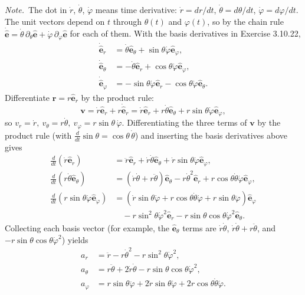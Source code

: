 \emph{Note.}~The dot in $\dot{r}$, $\dot{\theta}$, $\dot{\varphi}$ means time
derivative: $\dot{r}=dr/dt$, $\dot{\theta}=d\theta/dt$,
$\dot{\varphi}=d\varphi/dt$.
\solution
The unit vectors depend on $t$ through $\theta(t)$ and $\varphi(t)$,
so by the chain rule
$\dot{\hat{\mathbf e}}=\dot\theta\,\partial_\theta\hat{\mathbf e}
+\dot\varphi\,\partial_\varphi\hat{\mathbf e}$ for each of them. With
the basis derivatives in Exercise 3.10.22,
\[
\begin{aligned}
\dot{\hat{\mathbf e}}_r&=\dot\theta\hat{\mathbf e}_\theta+
\sin\theta\dot\varphi\hat{\mathbf e}_\varphi,\\
\dot{\hat{\mathbf e}}_\theta&=-\dot\theta\hat{\mathbf e}_r+
\cos\theta\dot\varphi\hat{\mathbf e}_\varphi,\\
\dot{\hat{\mathbf e}}_\varphi&=-\sin\theta\dot\varphi\hat{\mathbf e}_r
-\cos\theta\dot\varphi\hat{\mathbf e}_\theta.
\end{aligned}
\]
Differentiate $\mathbf r=r\hat{\mathbf e}_r$ by the product rule:
\[
\mathbf v=\dot r\hat{\mathbf e}_r+r\dot{\hat{\mathbf e}}_r
=\dot r\hat{\mathbf e}_r+r\dot\theta\hat{\mathbf e}_\theta+
r\sin\theta\dot\varphi\hat{\mathbf e}_\varphi,
\]
so $\boxed{v_r=\dot r,\ v_\theta=r\dot\theta,\
v_\varphi=r\sin\theta\,\dot\varphi}$.
Differentiating the three terms of $\mathbf v$ by the product rule
(with $\frac d{dt}\sin\theta=\cos\theta\,\dot\theta$) and inserting the
basis derivatives above gives
\[
\begin{aligned}
\frac d{dt}(\dot r\hat{\mathbf e}_r)
&=\ddot r\hat{\mathbf e}_r+\dot r\dot\theta\hat{\mathbf e}_\theta
+\dot r\sin\theta\dot\varphi\hat{\mathbf e}_\varphi,\\
\frac d{dt}(r\dot\theta\hat{\mathbf e}_\theta)
&=(\dot r\dot\theta+r\ddot\theta)\hat{\mathbf e}_\theta
-r\dot\theta^2\hat{\mathbf e}_r
+r\cos\theta\dot\theta\dot\varphi\hat{\mathbf e}_\varphi,\\
\frac d{dt}(r\sin\theta\dot\varphi\hat{\mathbf e}_\varphi)
&=(\dot r\sin\theta\dot\varphi+r\cos\theta\dot\theta\dot\varphi+
r\sin\theta\ddot\varphi)\hat{\mathbf e}_\varphi\\
&\quad-r\sin^2\theta\dot\varphi^2\hat{\mathbf e}_r
-r\sin\theta\cos\theta\dot\varphi^2\hat{\mathbf e}_\theta.
\end{aligned}
\]
Collecting each basis vector (for example, the $\hat{\mathbf e}_\theta$
terms are $\dot r\dot\theta$, $\dot r\dot\theta+r\ddot\theta$, and
$-r\sin\theta\cos\theta\dot\varphi^2$) yields
\[
\boxed{\begin{aligned}
a_r&=\ddot r-r\dot\theta^2-r\sin^2\theta\dot\varphi^2,\\
a_\theta&=r\ddot\theta+2\dot r\dot\theta-r\sin\theta\cos\theta\dot\varphi^2,\\
a_\varphi&=r\sin\theta\ddot\varphi+2\dot r\sin\theta\dot\varphi
+2r\cos\theta\dot\theta\dot\varphi.
\end{aligned}}
\]

